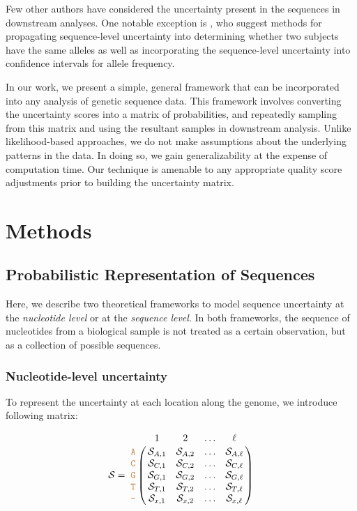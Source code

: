 \documentclass[
]{article}
\newcommand{\sq}[1]{\texttt{\textcolor{brown}{#1}}}
\newcommand{\nps}{\mathcal{S}} %
\begin{document}
Few other authors have considered the uncertainty present in the
sequences in downstream analyses. One notable exception is
\citet{oraweAccountingUncertaintyDNA2015}, who suggest methods for
propagating sequence-level uncertainty into determining whether two
subjects have the same alleles as well as incorporating the
sequence-level uncertainty into confidence intervals for allele
frequency.

In our work, we present a simple, general framework that can be
incorporated into any analysis of genetic sequence data. This framework
involves converting the uncertainty scores into a matrix of
probabilities, and repeatedly sampling from this matrix and using the
resultant samples in downstream analysis. Unlike likelihood-based
approaches, we do not make assumptions about the underlying patterns in
the data. In doing so, we gain generalizability at the expense of
computation time. Our technique is amenable to any appropriate quality
score adjustments prior to building the uncertainty matrix.

\hypertarget{methods}{%
\section{Methods}\label{methods}}

\hypertarget{probabilistic-representation-of-sequences}{%
\subsection{Probabilistic Representation of
Sequences}\label{probabilistic-representation-of-sequences}}

Here, we describe two theoretical frameworks to model sequence
uncertainty at the \emph{nucleotide level} or at the
\emph{sequence level}. In both frameworks, the sequence of nucleotides
from a biological sample is not treated as a certain observation, but as
a collection of possible sequences.

\hypertarget{nucleotide-level-uncertainty}{%
\subsubsection{Nucleotide-level
uncertainty}\label{nucleotide-level-uncertainty}}

To represent the uncertainty at each location along the genome, we
introduce following matrix:

\begin{equation}
\nps = \bordermatrix{   & 1 & 2 & \ldots & \ell \cr
                \sq{A} & \nps_{A, 1} & \nps_{A, 2} & \ldots & \nps_{A, \ell} \cr
                \sq{C} & \nps_{C, 1} & \nps_{C, 2} & \ldots & \nps_{C, \ell} \cr
                \sq{G} & \nps_{G, 1} & \nps_{G, 2} & \ldots & \nps_{G, \ell} \cr
                \sq{T} & \nps_{T, 1} & \nps_{T, 2} & \ldots & \nps_{T, \ell} \cr 
                \sq{-} & \nps_{x, 1} & \nps_{x, 2} & \ldots & \nps_{x, \ell} \cr 
}\label{eq:nps}
\end{equation}
\end{document}
